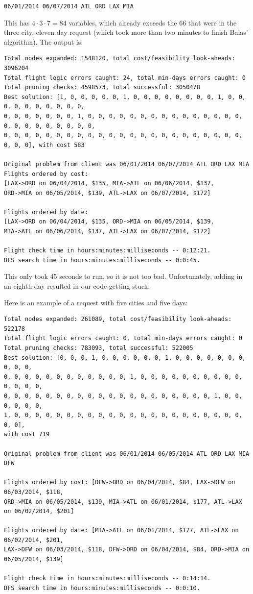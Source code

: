 \documentclass{article}
\begin{document}
\begin{verbatim}
06/01/2014 06/07/2014 ATL ORD LAX MIA
\end{verbatim}

This has $4 \cdot 3 \cdot 7 = 84$ variables, which already exceeds the 66 that were in the three city, eleven day request (which took more than two
minutes to finish Balas' algorithm). The output is:

\scriptsize
\begin{verbatim}
Total nodes expanded: 1548120, total cost/feasibility look-aheads: 3096204
Total flight logic errors caught: 24, total min-days errors caught: 0
Total pruning checks: 4598573, total successful: 3050478
Best solution: [1, 0, 0, 0, 0, 0, 1, 0, 0, 0, 0, 0, 0, 0, 0, 1, 0, 0, 0, 0, 0, 0, 0, 0, 0, 0,
0, 0, 0, 0, 0, 0, 0, 1, 0, 0, 0, 0, 0, 0, 0, 0, 0, 0, 0, 0, 0, 0, 0, 0, 0, 0, 0, 0, 0, 0, 0, 0,
0, 0, 0, 0, 0, 0, 0, 0, 0, 0, 0, 0, 0, 0, 0, 0, 0, 0, 0, 0, 0, 0, 0, 0, 0, 0], with cost 583

Original problem from client was 06/01/2014 06/07/2014 ATL ORD LAX MIA
Flights ordered by cost:
[LAX->ORD on 06/04/2014, $135, MIA->ATL on 06/06/2014, $137,
ORD->MIA on 06/05/2014, $139, ATL->LAX on 06/07/2014, $172]

Flights ordered by date:
[LAX->ORD on 06/04/2014, $135, ORD->MIA on 06/05/2014, $139,
MIA->ATL on 06/06/2014, $137, ATL->LAX on 06/07/2014, $172]

Flight check time in hours:minutes:milliseconds -- 0:12:21.
DFS search time in hours:minutes:milliseconds -- 0:0:45.
\end{verbatim}
\normalsize

This only took 45 seconds to run, so it is not too bad. Unfortunately, adding in an eighth day resulted in our code getting stuck.

Here is an example of a request with five cities and five days:


\scriptsize
\begin{verbatim}
Total nodes expanded: 261089, total cost/feasibility look-aheads: 522178
Total flight logic errors caught: 0, total min-days errors caught: 0
Total pruning checks: 783093, total successful: 522005
Best solution: [0, 0, 0, 1, 0, 0, 0, 0, 0, 0, 1, 0, 0, 0, 0, 0, 0, 0, 0, 0, 0,
0, 0, 0, 0, 0, 0, 0, 0, 0, 0, 0, 0, 1, 0, 0, 0, 0, 0, 0, 0, 0, 0, 0, 0, 0, 0, 0,
0, 0, 0, 0, 0, 0, 0, 0, 0, 0, 0, 0, 0, 0, 0, 0, 0, 0, 0, 0, 1, 0, 0, 0, 0, 0, 0,
1, 0, 0, 0, 0, 0, 0, 0, 0, 0, 0, 0, 0, 0, 0, 0, 0, 0, 0, 0, 0, 0, 0, 0, 0],
with cost 719

Original problem from client was 06/01/2014 06/05/2014 ATL ORD LAX MIA DFW

Flights ordered by cost: [DFW->ORD on 06/04/2014, $84, LAX->DFW on 06/03/2014, $118,
ORD->MIA on 06/05/2014, $139, MIA->ATL on 06/01/2014, $177, ATL->LAX on 06/02/2014, $201]

Flights ordered by date: [MIA->ATL on 06/01/2014, $177, ATL->LAX on 06/02/2014, $201,
LAX->DFW on 06/03/2014, $118, DFW->ORD on 06/04/2014, $84, ORD->MIA on 06/05/2014, $139]

Flight check time in hours:minutes:milliseconds -- 0:14:14.
DFS search time in hours:minutes:milliseconds -- 0:0:10.
\end{verbatim}
\normalsize
\end{document}
